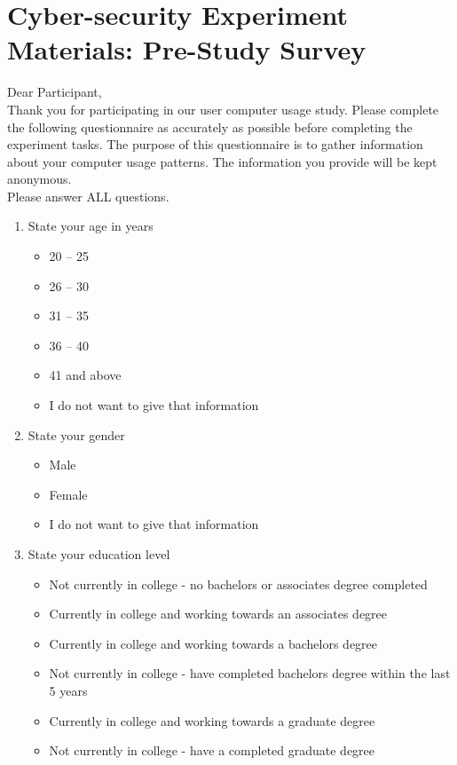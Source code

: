 \chapter{Cyber-security Experiment Materials: Pre-Study Survey}
\label{apx:cypre}
Dear Participant,\\
Thank you for participating in our user computer usage study. Please complete the following questionnaire as accurately as possible before completing the experiment tasks. The purpose of this questionnaire is to gather information about your computer usage patterns. The information you provide will be kept anonymous.\\
Please answer ALL questions.

\begin{enumerate}[topsep=-4em]
\item State your age in years
\begin{itemize}[topsep=-6em, label={o}]
\itemsep-1em 
\item 20 -- 25
\item 26 -- 30
\item 31 -- 35
\item 36 -- 40
\item 41 and above
\item I do not want to give that information
\end{itemize}
\item State your gender
\begin{itemize}[topsep=-6em, label={o}]
\itemsep-1em 
\item Male
\item Female
\item I do not want to give that information
\end{itemize}
\item State your education level
\begin{itemize}[topsep=-6em, label={o}]
\itemsep-1em 
\item Not currently in college - no bachelors or associates degree completed
\item Currently in college and working towards an associates degree
\item Currently in college and working towards a bachelors degree
\item Not currently in college - have completed bachelors degree within the last 5 years
\item Currently in college and working towards a graduate degree
\item Not currently in college - have a completed graduate degree

\end{itemize}
\end{enumerate}
